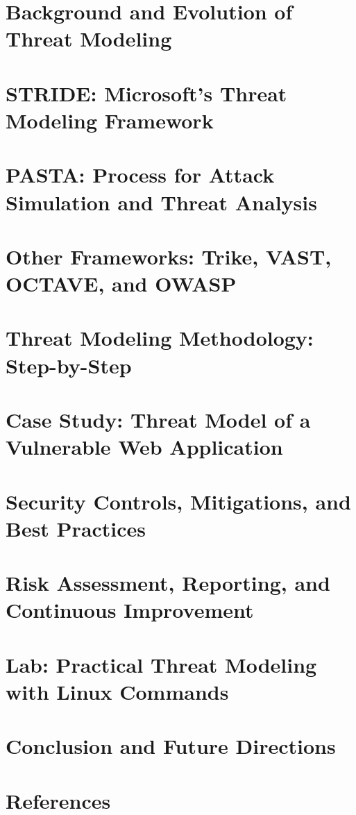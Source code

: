 \documentclass{article}
\begin{document}
\section{Background and Evolution of Threat Modeling}


\section{STRIDE: Microsoft’s Threat Modeling Framework}


\section{PASTA: Process for Attack Simulation and Threat Analysis}


\section{Other Frameworks: Trike, VAST, OCTAVE, and OWASP}


\section{Threat Modeling Methodology: Step-by-Step}


\section{Case Study: Threat Model of a Vulnerable Web Application}


\section{Security Controls, Mitigations, and Best Practices}


\section{Risk Assessment, Reporting, and Continuous Improvement}


\section{Lab: Practical Threat Modeling with Linux Commands}


\section{Conclusion and Future Directions}


\section{References}

\end{document}
